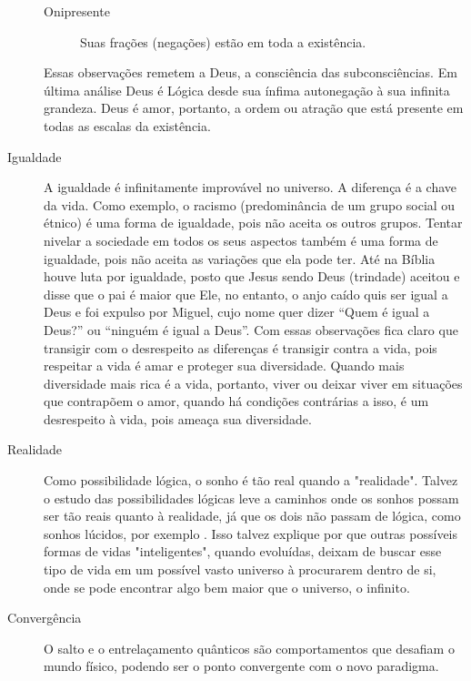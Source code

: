 \begin{description}
\begin{description}
		   \item[Onipresente] Suas frações (negações) estão em toda a existência.
	   \end{description}
	Essas observações remetem a Deus, a consciência das subconsciências. Em última análise Deus é Lógica desde sua ínfima autonegação à sua infinita grandeza. Deus é amor, portanto, a ordem ou atração que está presente em todas as escalas da existência.
	   \item[Igualdade] A igualdade é infinitamente improvável no universo. A diferença é a chave da vida. Como exemplo, o racismo (predominância de um grupo social ou étnico) é uma forma de igualdade, pois não aceita os outros grupos. Tentar nivelar a sociedade em todos os seus aspectos também é uma forma de igualdade, pois não aceita as variações que ela pode ter. Até na Bíblia houve luta por igualdade, posto que Jesus sendo Deus (trindade) aceitou e disse que o pai é maior que Ele, no entanto, o anjo caído quis ser igual a Deus e foi expulso por Miguel, cujo nome quer dizer “Quem é igual a Deus?” ou “ninguém é igual a Deus”. Com essas observações fica claro que transigir com o desrespeito as diferenças é transigir contra a vida, pois respeitar a vida é amar e proteger sua diversidade. Quando mais diversidade mais rica é a vida, portanto, viver ou deixar viver em situações que contrapõem o amor, quando há condições contrárias a isso, é um desrespeito à vida, pois ameaça sua diversidade. 
	   \item[Realidade] Como possibilidade lógica, o sonho é tão real quando a "realidade". Talvez o estudo das possibilidades lógicas leve a caminhos onde os sonhos possam ser tão reais quanto à realidade, já que os dois não passam de lógica, como sonhos lúcidos, por exemplo \cite{ administradores_principio_pareto}. Isso talvez explique por que outras possíveis formas de vidas "inteligentes", quando evoluídas, deixam de buscar esse tipo de vida em um possível vasto universo à procurarem dentro de si, onde se pode encontrar algo bem maior que o universo, o infinito.
	   \item[Convergência] O salto e o entrelaçamento quânticos são comportamentos que desafiam o mundo físico, podendo ser o ponto convergente com o novo paradigma.
	\end{description}